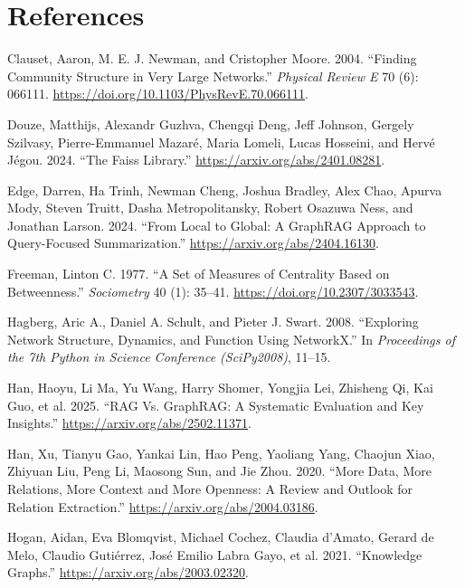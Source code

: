 \documentclass[
  letterpaper,
  DIV=11,
  numbers=noendperiod]{scrartcl}
\newlength{\cslhangindent}
\newenvironment{CSLReferences}[2] %
 {\begin{list}{}{%
  \setlength{\itemindent}{0pt}
  \setlength{\leftmargin}{0pt}
  \setlength{\parsep}{0pt}
  \ifodd #1
   \setlength{\leftmargin}{\cslhangindent}
   \setlength{\itemindent}{-1\cslhangindent}
  \fi
  \setlength{\itemsep}{#2\baselineskip}}}
 {\end{list}}
\begin{document}
\section*{References}\label{references}

\label{refs}
\begin{CSLReferences}{1}{0}
Clauset, Aaron, M. E. J. Newman, and Cristopher Moore. 2004. {``Finding
Community Structure in Very Large Networks.''} \emph{Physical Review E}
70 (6): 066111. \url{https://doi.org/10.1103/PhysRevE.70.066111}.

Douze, Matthijs, Alexandr Guzhva, Chengqi Deng, Jeff Johnson, Gergely
Szilvasy, Pierre-Emmanuel Mazaré, Maria Lomeli, Lucas Hosseini, and
Hervé Jégou. 2024. {``The {Faiss} Library.''}
\url{https://arxiv.org/abs/2401.08281}.

Edge, Darren, Ha Trinh, Newman Cheng, Joshua Bradley, Alex Chao, Apurva
Mody, Steven Truitt, Dasha Metropolitansky, Robert Osazuwa Ness, and
Jonathan Larson. 2024. {``From Local to Global: A {GraphRAG} Approach to
Query-Focused Summarization.''} \url{https://arxiv.org/abs/2404.16130}.

Freeman, Linton C. 1977. {``A Set of Measures of Centrality Based on
Betweenness.''} \emph{Sociometry} 40 (1): 35--41.
\url{https://doi.org/10.2307/3033543}.

Hagberg, Aric A., Daniel A. Schult, and Pieter J. Swart. 2008.
{``Exploring Network Structure, Dynamics, and Function Using
{NetworkX}.''} In \emph{Proceedings of the 7th Python in Science
Conference (SciPy2008)}, 11--15.

Han, Haoyu, Li Ma, Yu Wang, Harry Shomer, Yongjia Lei, Zhisheng Qi, Kai
Guo, et al. 2025. {``{RAG} Vs. {GraphRAG}: A Systematic Evaluation and
Key Insights.''} \url{https://arxiv.org/abs/2502.11371}.

Han, Xu, Tianyu Gao, Yankai Lin, Hao Peng, Yaoliang Yang, Chaojun Xiao,
Zhiyuan Liu, Peng Li, Maosong Sun, and Jie Zhou. 2020. {``More Data,
More Relations, More Context and More Openness: A Review and Outlook for
Relation Extraction.''} \url{https://arxiv.org/abs/2004.03186}.

Hogan, Aidan, Eva Blomqvist, Michael Cochez, Claudia d'Amato, Gerard de
Melo, Claudio Gutiérrez, José Emilio Labra Gayo, et al. 2021.
{``Knowledge Graphs.''} \url{https://arxiv.org/abs/2003.02320}.


\end{CSLReferences}
\end{document}
